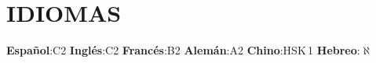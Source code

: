 \section{IDIOMAS}
\begin{itemize}[leftmargin=0in, label={}]
  \small{\item{
    \textbf{Español}\hspace{2pt}:\hspace{4pt}C2\hspace{12pt}
    \textbf{Inglés}\hspace{2pt}:\hspace{4pt}C2\hspace{12pt}
    \textbf{Francés}\hspace{2pt}:\hspace{4pt}B2\hspace{12pt}
    \textbf{Alemán}\hspace{2pt}:\hspace{4pt}A2\hspace{12pt}
    \textbf{Chino}\hspace{2pt}:\hspace{4pt}HSK\,1\hspace{12pt}
    \textbf{Hebreo}\hspace{2pt}:\hspace{4pt}$\aleph$
  }}
\end{itemize}
